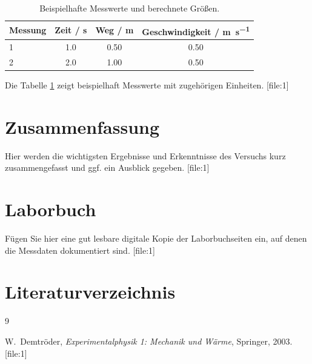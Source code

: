 \documentclass[11pt,a4paper]{article}
\numberwithin{equation}{section}%
\numberwithin{equation}{section}
\begin{document}
\begin{table}[h]
    \centering
    \caption{Beispielhafte Messwerte und berechnete Größen.}
    \label{tab:messwerte}
    \begin{tabular}{lccc}
        \toprule
        Messung & Zeit / \si{\second} & Weg / \si{\meter} & Geschwindigkeit / \si{\meter\per\second} \\
        \midrule
        1 & 1.0 & 0.50 & 0.50 \\
        2 & 2.0 & 1.00 & 0.50 \\
        \bottomrule
    \end{tabular}
\end{table}

Die Tabelle \ref{tab:messwerte} zeigt beispielhaft Messwerte mit zugehörigen Einheiten. [file:1]

\section{Zusammenfassung}

Hier werden die wichtigsten Ergebnisse und Erkenntnisse des Versuchs kurz zusammengefasst und ggf. ein Ausblick gegeben. [file:1]

\appendix
\section{Laborbuch}

Fügen Sie hier eine gut lesbare digitale Kopie der Laborbuchseiten ein, auf denen die Messdaten dokumentiert sind. [file:1]

\section{Literaturverzeichnis}

\begin{thebibliography}{9}

W.~Demtröder, \emph{Experimentalphysik 1: Mechanik und Wärme}, Springer, 2003. [file:1]


\end{thebibliography}
\end{document}
